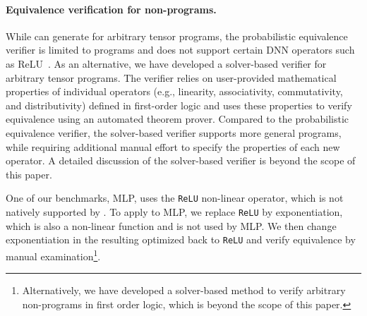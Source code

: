\paragraph{Equivalence verification for non-\lax programs.} While \sys can generate \graphs for arbitrary tensor programs, the probabilistic equivalence verifier is limited to \lax programs and does not support certain DNN operators such as ReLU~\cite{relu}. 
As an alternative, we have developed a solver-based verifier for arbitrary tensor programs. The verifier relies on user-provided mathematical properties of individual operators (e.g., linearity, associativity, commutativity, and distributivity) defined in first-order logic and uses these properties to verify equivalence using an automated theorem prover. Compared to the probabilistic equivalence verifier, the solver-based verifier supports more general programs, while requiring additional manual effort to specify the properties of each new operator. A detailed discussion of the solver-based verifier is beyond the scope of this paper.

One of our benchmarks, MLP, uses the {\tt ReLU} non-linear operator, which is not natively supported by \sys.
To apply \sys to MLP, we replace {\tt ReLU} by exponentiation, which is also a non-linear function and is not used by MLP. We then change exponentiation in the resulting optimized \graph back to {\tt ReLU} and verify equivalence by manual examination\footnote{Alternatively, we have developed a solver-based method to verify arbitrary non-\lax programs in first order logic, which is beyond the scope of this paper.}.
\fi